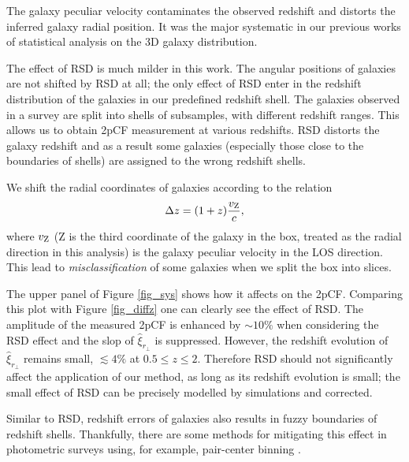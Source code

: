 \documentclass[iop]{emulateapj}
\begin{document}
The galaxy peculiar velocity contaminates the observed redshift and distorts 
the inferred galaxy radial position.
It was the major systematic in our previous works \citep{Li2014,Li2015,Li2016}
of statistical analysis on the 3D galaxy distribution.

The effect of RSD is much milder in this work. 
The angular positions of galaxies are not shifted by RSD at all;
the only effect of RSD enter in the redshift distribution of the galaxies in our predefined redshift shell.
The galaxies observed in a survey are split into shells of subsamples, 
with different redshift ranges. This allows us to obtain 2pCF measurement at various redshifts.
RSD distorts the galaxy redshift and as a result some galaxies 
(especially those close to the boundaries of shells) are assigned to the wrong redshift shells.

We shift the radial coordinates of galaxies according to the relation 
\begin{equation}\label{eq:zvpeu}
\Delta z = (1+z) \frac{v_{{\rm Z}}}{c},
\end{equation}
where $v_{{\rm Z}}$ (Z is the third coordinate of the galaxy in the box, treated as the radial direction in this analysis) 
is the galaxy peculiar velocity in the LOS direction.
This lead to {\it misclassification} of some galaxies when we split the box into slices.

The upper panel of Figure \ref{fig_sys} shows how it affects on the 2pCF.
Comparing this plot with Figure \ref{fig_diffz} one can clearly see the effect of RSD.
The amplitude of the measured 2pCF is enhanced by $\sim 10\%$ when considering the RSD effect 
and the slop of $\hat\xi_{r_\perp}$ is suppressed.
However, the redshift evolution of $\hat\xi_{r_\perp}$ remains small,  $\lesssim4\%$ at $0.5\leq z \leq 2$.
Therefore RSD should not significantly affect the application of our method, as long as its redshift evolution is small;
the small effect of RSD can be precisely modelled by simulations and corrected.

Similar to RSD, redshift errors of galaxies
also results in fuzzy boundaries of redshift shells.
Thankfully, there are some methods for mitigating this effect in photometric surveys using, for example, pair-center binning \citep{2010MNRAS.407..520N, 2011MNRAS.415.2193R}. 
\end{document}
